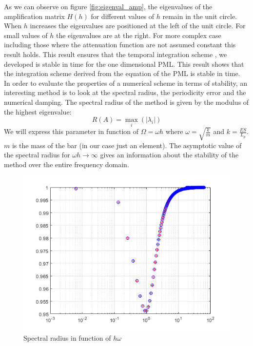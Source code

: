 As we can observe on figure \ref{fig:eigenval_amp}, the eigenvalues of the amplification matrix $H(h)$ for different values of $h$ remain in the unit circle. When $h$ increases the eigenvalues are positioned at the left of the unit circle. For small values of $h$ the eigenvalues are at the right. For more complex case including those where the attenuation function are not assumed constant this result holds. This result ensures that the temporal integration scheme , we developed is stable in time for the one dimensional PML. This result shows that the integration scheme derived from the equation of the PML is stable in time. \\
In order to evaluate the properties of a numerical scheme in terms of stability, an interesting method is to look at the spectral radius, the periodicity error and the numerical damping. The spectral radius of the method is given by the modulus of the highest eigenvalue:
\begin{equation}
    R(A) = \max_i(|\lambda_i|)
\end{equation}
We will express this parameter in function of $\Omega = \omega h$ where $\omega = \sqrt{\frac{k}{m}}$ and $k=\frac{E S}{L_p}$. $m$ is the mass of the bar (in our case just an element). The asymptotic value of the spectral radius for $\omega h \rightarrow \infty$ gives an information about the stability of the method over the entire frequency domain.
\begin{figure}[H]
    \centering
    \includegraphics[scale=0.6]{images/spectral_rad.png}
    \caption{Spectral radius in function of $h\omega$}
    \label{fig:spectral_rad}
\end{figure}
